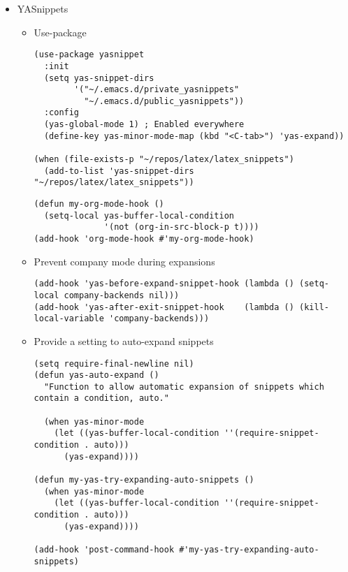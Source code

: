 \documentclass{article}
\begin{document}
\begin{itemize}
\begin{itemize}
\begin{verbatim}
\end{verbatim}
\end{itemize}

\item YASnippets
\label{sec:org5eedac9}
\begin{itemize}
\item Use-package
\label{sec:orga1cebfd}
\begin{verbatim}
(use-package yasnippet
  :init
  (setq yas-snippet-dirs
        '("~/.emacs.d/private_yasnippets"
          "~/.emacs.d/public_yasnippets"))
  :config
  (yas-global-mode 1) ; Enabled everywhere
  (define-key yas-minor-mode-map (kbd "<C-tab>") 'yas-expand))

(when (file-exists-p "~/repos/latex/latex_snippets")
  (add-to-list 'yas-snippet-dirs "~/repos/latex/latex_snippets"))

\end{verbatim}

\begin{verbatim}
(defun my-org-mode-hook ()
  (setq-local yas-buffer-local-condition
              '(not (org-in-src-block-p t))))
(add-hook 'org-mode-hook #'my-org-mode-hook)
\end{verbatim}
\item Prevent company mode during expansions
\label{sec:org0646bec}
\begin{verbatim}
(add-hook 'yas-before-expand-snippet-hook (lambda () (setq-local company-backends nil)))
(add-hook 'yas-after-exit-snippet-hook    (lambda () (kill-local-variable 'company-backends)))

\end{verbatim}
\item Provide a setting to auto-expand snippets
\label{sec:orgd23f1a9}
\begin{verbatim}
(setq require-final-newline nil)
(defun yas-auto-expand ()
  "Function to allow automatic expansion of snippets which contain a condition, auto."

  (when yas-minor-mode
    (let ((yas-buffer-local-condition ''(require-snippet-condition . auto)))
      (yas-expand))))

(defun my-yas-try-expanding-auto-snippets ()
  (when yas-minor-mode
    (let ((yas-buffer-local-condition ''(require-snippet-condition . auto)))
      (yas-expand))))

(add-hook 'post-command-hook #'my-yas-try-expanding-auto-snippets)


\end{verbatim}
\end{itemize}


\end{itemize}
\end{document}

